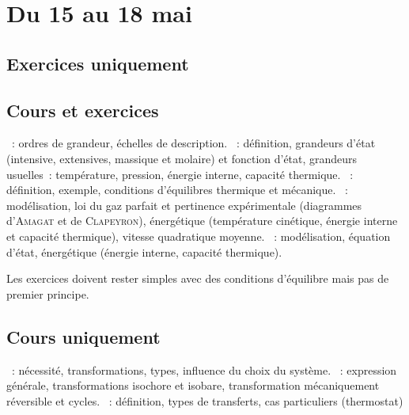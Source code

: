\documentclass[a4paper, 11pt, final, garamond]{book}
\begin{document}
\setcounter{chapter}{24}

\chapter{Du 15 au 18 mai}

\section{Exercices uniquement}

\section{Cours et exercices}
\begin{enumerate}[label=\Roman*]
	~: ordres de grandeur, échelles de description.
	~: définition, grandeurs d'état (intensive, extensives,
	massique et molaire) et fonction d'état, grandeurs usuelles~: température,
	pression, énergie interne, capacité thermique.
	~: définition, exemple, conditions
	d'équilibres thermique et mécanique.
	~: modélisation, loi du gaz parfait et pertinence
	expérimentale (diagrammes d'\textsc{Amagat} et de \textsc{Clapeyron}),
	énergétique (température cinétique, énergie interne
	et capacité thermique), vitesse quadratique moyenne.
	~: modélisation, équation d'état, énergétique
	(énergie interne, capacité thermique).
\end{enumerate}

\begin{framed}
	\begin{center}
		\large
		Les exercices doivent rester simples avec des conditions d'équilibre mais
		pas de premier principe.
	\end{center}
\end{framed}

\section{Cours uniquement}
\begin{enumerate}[label=\Roman*]
	~: nécessité, transformations, types, influence du choix
	du système.
	~: expression générale, transformations
	isochore et isobare, transformation mécaniquement réversible et cycles.
	~: définition, types de transferts, cas
	particuliers (thermostat)
\end{enumerate}
\end{document}
